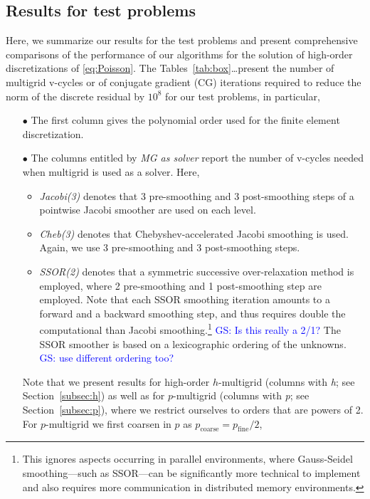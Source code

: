 \documentclass[smallcondensed,final]{svjour3}     %
\newcommand{\gsnote}[1]{\textcolor{blue}{GS: #1}}
\begin{document}
\subsection{Results for test problems}\label{subsec:results}
Here, we summarize our results for the test problems and present
comprehensive comparisons of the performance of our algorithms for the
solution of high-order discretizations of \eqref{eq:Poisson}.  The
Tables~\ref{tab:box}\ldots present the number of multigrid v-cycles or
of conjugate gradient (CG) iterations required to reduce the norm of
the discrete residual by $10^8$ for our test problems, in particular,
\begin{itemize}
\item[$\bullet$] The first column gives the polynomial order used for the finite
  element discretization.
\item[$\bullet$] The columns entitled by \emph{MG as solver} report the number of
  v-cycles needed when multigrid is used as a solver. Here,
  \begin{itemize}
  \item \emph{Jacobi(3)} denotes that 3 pre-smoothing and 3
    post-smoothing steps of a pointwise Jacobi smoother are used on
    each level.
  \item \emph{Cheb(3)} denotes that Chebyshev-accelerated Jacobi
    smoothing is used. Again, we use 3 pre-smoothing and 3
    post-smoothing steps.
  \item \emph{SSOR(2)} denotes that a symmetric successive
    over-relaxation method is employed, where 2 pre-smoothing and 1
    post-smoothing step are employed. Note that each SSOR smoothing
    iteration amounts to a forward and a backward smoothing step, and
    thus requires double the computational than Jacobi
    smoothing.\footnote{This ignores aspects occurring in parallel
      environments, where Gauss-Seidel smoothing---such as SSOR---can be
      significantly more technical to implement and also requires more
      communication in distributed memory environments.}  \gsnote{Is
      this really a 2/1?}  The SSOR smoother is based on a
    lexicographic ordering of the unknowns. \gsnote{use different
      ordering too?}
  \end{itemize}
  Note that we present results for high-order $h$-multigrid (columns
  with \emph{h}; see Section~\ref{subsec:h}) as well as for
  $p$-multigrid (columns with \emph{p}; see Section~\ref{subsec:p}),
  where we restrict ourselves to orders that are powers of 2. For
  $p$-multigrid we first coarsen in $p$ as $p_\text{coarse} = p_\text{fine}/2$,

\end{itemize}
\end{document}
